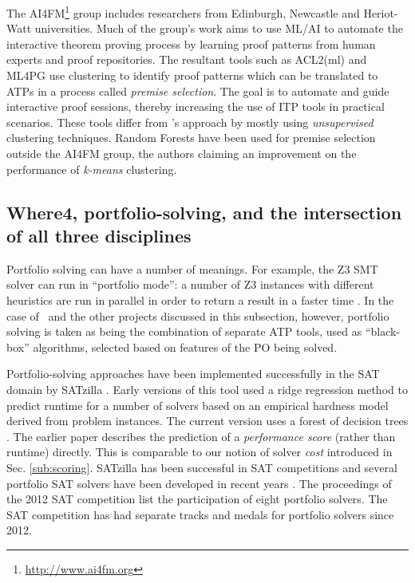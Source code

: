 The AI4FM\footnote{\url{http://www.ai4fm.org}} group includes researchers from Edinburgh, Newcastle and Heriot-Watt universities. Much of the group's work \cite{Heras2013, ML4PG, bundy_et_al:DR:2012:3731} aims to use ML/AI to automate the interactive theorem proving process by learning proof patterns from human experts and proof repositories. The resultant tools such as ACL2(ml) \cite{Heras2013} and ML4PG \cite{ML4PG} use clustering to identify proof patterns which can be translated to ATPs in a process called \textit{premise selection}. The goal is to automate and guide interactive proof sessions, thereby increasing the use of ITP tools in practical scenarios. These tools differ from \where's approach by mostly using \textit{unsupervised} clustering techniques. Random Forests have been used for premise selection \cite{Farber2015} outside the AI4FM group, the authors claiming an improvement on the performance of \textit{k-means} clustering. 

\subsection{Where4, portfolio-solving, and the intersection of all three disciplines}
\label{sub:lrsvmmml}

Portfolio solving can have a number of meanings. For example, the Z3 SMT solver can run in ``portfolio mode'': a number of Z3 instances with different heuristics are run in parallel in order to return a result in a faster time \cite{WintersteigerHM09}. In the case of \where~and the other projects discussed in this subsection, however, portfolio solving is taken as being the combination of separate ATP tools, used as ``black-box'' algorithms, selected based on features of the PO being solved.

Portfolio-solving approaches have been implemented successfully in the SAT domain by SATzilla \cite{Satzilla}. Early versions of this tool used a ridge regression method to predict runtime for a number of solvers based on an empirical hardness model derived from problem instances. The current version \cite{SATzilla2012} uses a forest of decision trees . The earlier paper describes the prediction of a \textit{performance score} (rather than runtime) directly.  This is comparable to our notion of solver \textit{cost} introduced in Sec. \ref{sub:scoring}. SATzilla has been successful in SAT competitions and several portfolio SAT solvers have been developed in recent years \cite{SAT2012}.  The proceedings of the 2012 SAT competition 
list the participation of eight portfolio solvers. The SAT competition has had separate tracks and medals for portfolio solvers since 2012.  

